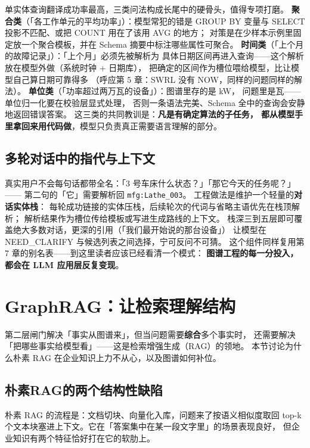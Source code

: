 单实体查询翻译成功率最高，三类问法构成长尾中的硬骨头，值得专项打磨。
\textbf{聚合类}（「各工作单元的平均功率」）：模型常犯的错是
GROUP BY 变量与 SELECT 投影不匹配、或把 COUNT 用在了该用 AVG 的地方；
对策是在少样本示例里固定放一个聚合模板，并在 Schema 摘要中标注哪些属性可聚合。
\textbf{时间类}（「上个月的故障记录」）：「上个月」必须先被解析为
具体日期区间再进入查询——这个解析放在模型外做（系统时钟 + 日期库），
把确定的区间作为槽位喂给模型，比让模型自己算日期可靠得多
（呼应第 5 章：SWRL 没有 NOW，同样的问题同样的解法）。
\textbf{单位类}（「功率超过两万瓦的设备」）：图谱里存的是 kW，
问题里是瓦——单位归一化要在校验层显式处理，
否则一条语法完美、Schema 全中的查询会安静地返回错误答案。
这三类的共同教训是：\textbf{凡是有确定算法的子任务，
都从模型手里拿回来用代码做}，模型只负责真正需要语言理解的部分。

\subsection{多轮对话中的指代与上下文}

真实用户不会每句话都带全名：「3 号车床什么状态？」「那它今天的任务呢？」——
第二句的「它」需要解析回 \texttt{mfg:Lathe\_003}。
工程做法是维护一个轻量的\textbf{对话实体栈}：
每轮成功链接的实体压栈，后续轮次的代词与省略主语优先在栈顶解析；
解析结果作为槽位传给模板或写进生成路线的上下文。
栈深三到五层即可覆盖绝大多数对话，更深的引用（「我们最开始说的那台设备」）
让模型在 NEED\_CLARIFY 与候选列表之间选择，宁可反问不可猜。
这个组件同样复用第 7 章的别名表——到这里读者应该已经看清一个模式：
\textbf{图谱工程的每一分投入，都会在 LLM 应用层反复变现}。

\section{GraphRAG：让检索理解结构}

第二层闸门解决「事实从图谱来」，但当问题需要\textbf{综合}多个事实时，
还需要解决「把哪些事实给模型看」——这是检索增强生成（RAG）的领地。
本节讨论为什么朴素 RAG 在企业知识上力不从心，以及图谱如何补位。

\subsection{朴素RAG的两个结构性缺陷}

朴素 RAG 的流程是：文档切块、向量化入库，问题来了按语义相似度取回
top-k 个文本块塞进上下文。它在「答案集中在某一段文字里」的场景表现良好，
但企业知识有两个特征恰好打在它的软肋上。

